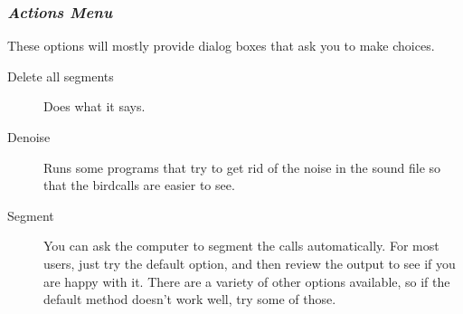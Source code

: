 \documentclass{article}
\begin{document}
\subsubsection{{\em Actions Menu}}
\label{sec:action}

These options will mostly provide dialog boxes that ask you to make choices. 

\begin{description}
\item [Delete all segments] Does what it says. 
\item [Denoise] Runs some programs that try to get rid of the noise in the sound file so that the birdcalls are easier to see. 
\item [Segment] You can ask the computer to segment the calls automatically. 
For most users, just try the default option, and then review the output to see if you are happy with it. There are a variety of other options available, so if the default method doesn't work well, try some of those. 


\end{description}
\end{document}

